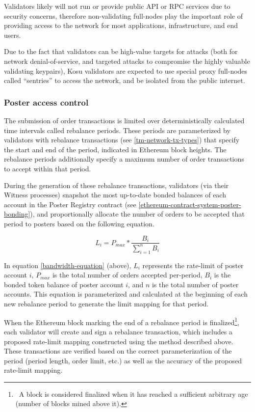 \documentclass[10pt]{article}
\begin{document}
Validators likely will not run or provide public API or RPC services due to security concerns, therefore non-validating full-nodes play the important role of providing access to the network for most applications, infrastructure, and end users.
\medskip

Due to the fact that validators can be high-value targets for attacks (both for network denial-of-service, and targeted attacks to compromise the highly valuable validating keypairs), Kosu validators are expected to use special proxy full-nodes called ``sentries'' to access the network, and be isolated from the public internet\cite{sentry-architecture}.
\subsubsection{Poster access control}\label{tm-network-access}
The submission of order transactions is limited over deterministically calculated time intervals called rebalance periods. These periods are parameterized by validators with rebalance transactions (see \ref{tm-network-tx-types}) that specify the start and end of the period, indicated in Ethereum block heights. The rebalance periods additionally specify a maximum number of order transactions to accept within that period. 
\medskip

During the generation of these rebalance transactions, validators (via their Witness processes) snapshot the most up-to-date bonded balances of each account in the Poster Registry contract (see \ref{ethereum-contract-system-poster-bonding}), and proportionally allocate the number of orders to be accepted that period to posters based on the following equation.

\begin{equation}\label{bandwidth-equation}
  L_i =  P_{max} * \frac{B_i}{\sum_{i=1}^{n}B_i}
\end{equation}
\medskip

In equation \ref{bandwidth-equation} (above), $L_i$ represents the rate-limit of poster account $i$, $P_{max}$ is the total number of orders accepted per-period, $B_i$ is the bonded token balance of poster account $i$, and $n$ is the total number of poster accounts. This equation is parameterized and calculated at the beginning of each new rebalance period to generate the limit mapping for that period.
\medskip 

When the Ethereum block marking the end of a rebalance period is finalized\footnote{\ A block is considered finalized when it has reached a sufficient arbitrary age (number of blocks mined above it).}, each validator will create and sign a rebalance transaction, which includes a proposed rate-limit mapping constructed using the method described above. These transactions are verified based on the correct parameterization of the period (period length, order limit, etc.) as well as the accuracy of the proposed rate-limit mapping. 
\medskip
\end{document}
